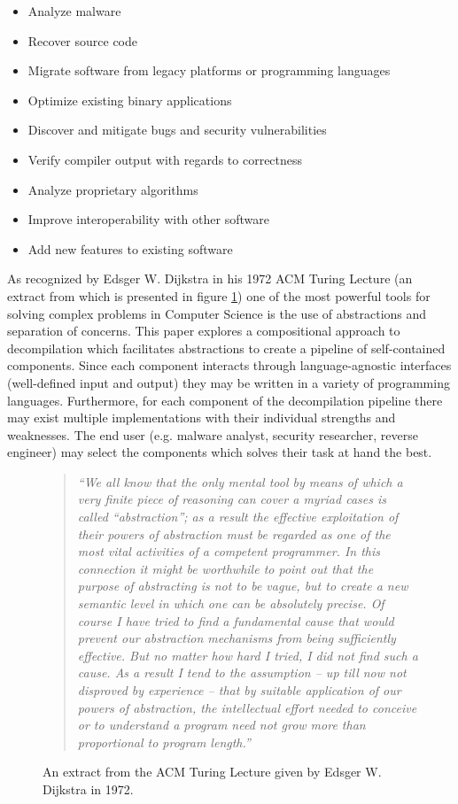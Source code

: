 \documentclass[12pt, a4paper]{article}
\begin{document}
\begin{itemize}
	\item Analyze malware
	\item Recover source code
	\item Migrate software from legacy platforms or programming languages
	\item Optimize existing binary applications
	\item Discover and mitigate bugs and security vulnerabilities
	\item Verify compiler output with regards to correctness
	\item Analyze proprietary algorithms
	\item Improve interoperability with other software
	\item Add new features to existing software
\end{itemize}

As recognized by Edsger W. Dijkstra in his 1972 ACM Turing Lecture (an extract from which is presented in figure \ref{dijkstra_lecture}) one of the most powerful tools for solving complex problems in Computer Science is the use of abstractions and separation of concerns. This paper explores a compositional approach to decompilation which facilitates abstractions to create a pipeline of self-contained components. Since each component interacts through language-agnostic interfaces (well-defined input and output) they may be written in a variety of programming languages. Furthermore, for each component of the decompilation pipeline there may exist multiple implementations with their individual strengths and weaknesses. The end user (e.g. malware analyst, security researcher, reverse engineer) may select the components which solves their task at hand the best.

\begin{figure}[htbp]
	\begin{quote}
		\textit{``We all know that the only mental tool by means of which a very finite piece of reasoning can cover a myriad cases is called ``abstraction''; as a result the effective exploitation of their powers of abstraction must be regarded as one of the most vital activities of a competent programmer. In this connection it might be worthwhile to point out that the purpose of abstracting is not to be vague, but to create a new semantic level in which one can be absolutely precise. Of course I have tried to find a fundamental cause that would prevent our abstraction mechanisms from being sufficiently effective. But no matter how hard I tried, I did not find such a cause. As a result I tend to the assumption -- up till now not disproved by experience -- that by suitable application of our powers of abstraction, the intellectual effort needed to conceive or to understand a program need not grow more than proportional to program length.''} \cite{abstractions_quote}
	\end{quote}
	\caption{An extract from the ACM Turing Lecture given by Edsger W. Dijkstra in 1972.}
	\label{dijkstra_lecture}
\end{figure}
\end{document}
